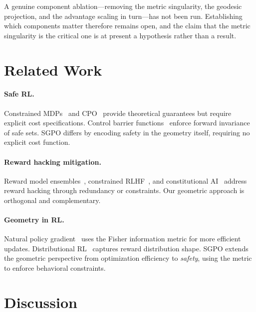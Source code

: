 \documentclass{article}
\begin{document}
A genuine component ablation---removing the metric singularity, the geodesic projection, and the advantage scaling in turn---has not been run. Establishing which components matter therefore remains open, and the claim that the metric singularity is the critical one is at present a hypothesis rather than a result.

\section{Related Work}
\label{sec:related}

\paragraph{Safe RL.} Constrained MDPs~\citep{altman1999constrained} and CPO~\citep{achiam2017constrained} provide theoretical guarantees but require explicit cost specifications. Control barrier functions~\citep{ames2019control} enforce forward invariance of safe sets. SGPO differs by encoding safety in the geometry itself, requiring no explicit cost function.

\paragraph{Reward hacking mitigation.} Reward model ensembles~\citep{coste2024reward}, constrained RLHF~\citep{moskovitz2024confronting}, and constitutional AI~\citep{bai2022constitutional} address reward hacking through redundancy or constraints. Our geometric approach is orthogonal and complementary.

\paragraph{Geometry in RL.} Natural policy gradient~\citep{schulman2015trust} uses the Fisher information metric for more efficient updates. Distributional RL~\citep{bellemare2017distributional} captures reward distribution shape. SGPO extends the geometric perspective from optimization efficiency to \emph{safety}, using the metric to enforce behavioral constraints.

\section{Discussion}
\label{sec:discussion}
\end{document}
